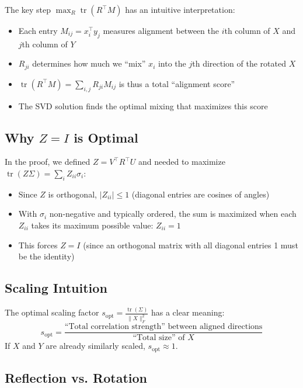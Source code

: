 \documentclass[11pt]{article}
\begin{document}
The key step $\max_R \operatorname{tr}(R^\top M)$ has an intuitive interpretation:
\begin{itemize}
    \item Each entry $M_{ij} = x_i^\top y_j$ measures alignment between the $i$th column of $X$ and $j$th column of $Y$
    \item $R_{ji}$ determines how much we ``mix'' $x_i$ into the $j$th direction of the rotated $X$
    \item $\operatorname{tr}(R^\top M) = \sum_{i,j} R_{ji} M_{ij}$ is thus a total ``alignment score''
    \item The SVD solution finds the optimal mixing that maximizes this score
\end{itemize}

\subsection{Why $Z = I$ is Optimal}
\label{subsec:why-z-i}

In the proof, we defined $Z = V^\top R^\top U$ and needed to maximize $\operatorname{tr}(Z\Sigma) = \sum_i Z_{ii} \sigma_i$:
\begin{itemize}
    \item Since $Z$ is orthogonal, $|Z_{ii}| \leq 1$ (diagonal entries are cosines of angles)
    \item With $\sigma_i$ non-negative and typically ordered, the sum is maximized when each $Z_{ii}$ takes its maximum possible value: $Z_{ii} = 1$
    \item This forces $Z = I$ (since an orthogonal matrix with all diagonal entries 1 must be the identity)
\end{itemize}

\subsection{Scaling Intuition}
\label{subsec:scaling-intuition}

The optimal scaling factor $s_{\text{opt}} = \frac{\operatorname{tr}(\Sigma)}{\|X\|_F^2}$ has a clear meaning:
\[
s_{\text{opt}} = \frac{\text{``Total correlation strength'' between aligned directions}}{\text{``Total size'' of $X$}}
\]
If $X$ and $Y$ are already similarly scaled, $s_{\text{opt}} \approx 1$.

\subsection{Reflection vs. Rotation}
\label{subsec:reflection-intuition}
\end{document}
